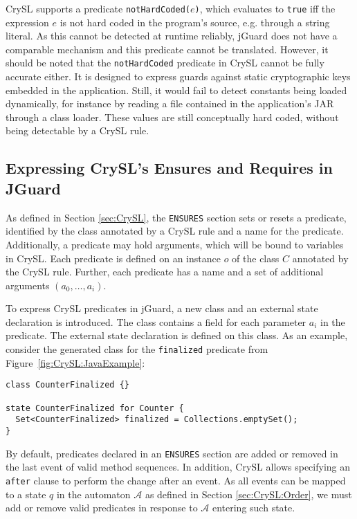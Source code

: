 \documentclass{article}
\begin{document}
CrySL supports a predicate \texttt{notHardCoded($e$)}, which evaluates to \texttt{true} iff
the expression $e$ is not hard coded in the program's source, e.g. through a string literal.
As this cannot be detected at runtime reliably, jGuard does not have a comparable mechanism and this
predicate cannot be translated.
However, it should be noted that the \texttt{notHardCoded} predicate in CrySL cannot be fully accurate either.
It is designed to express guards against static cryptographic keys embedded in the application.
Still, it would fail to detect constants being loaded dynamically, for instance by reading a file
contained in the application's JAR through a class loader.
These values are still conceptually hard coded, without being detectable by a CrySL rule.


\subsection{Expressing CrySL's Ensures and Requires in JGuard}\label{sec:CrySL:Ensures}

As defined in Section \ref{sec:CrySL}, the \texttt{ENSURES} section sets or resets a predicate, identified by the class annotated
by a CrySL rule and a name for the predicate. Additionally, a predicate may hold arguments, which
will be bound to variables in CrySL. Each predicate is defined on an instance $o$ of the class $C$ annotated by the CrySL rule. Further, each predicate
has a name and a set of additional arguments $(a_0, \ldots, a_i)$.


To express CrySL predicates in jGuard, a new class and an external state declaration is introduced. The class contains a field
for each parameter $a_i$ in the predicate. The external state declaration is defined on this class.
As an example, consider the generated class for the \texttt{finalized} predicate from Figure~\ref{fig:CrySL:JavaExample}:

\begin{lstlisting}[style=jGuard]
class CounterFinalized {}

state CounterFinalized for Counter {
  Set<CounterFinalized> finalized = Collections.emptySet();
}
\end{lstlisting}

By default, predicates declared in an \texttt{ENSURES} section are added or removed in the
last event of valid method sequences.
In addition, CrySL allows specifying an \texttt{after} clause to perform the change after an event.
As all events can be mapped to a state $q$ in the automaton $\mathcal{A}$ as defined in Section \ref{sec:CrySL:Order},
we must add or remove valid predicates in response to $\mathcal{A}$ entering such state.
\end{document}
